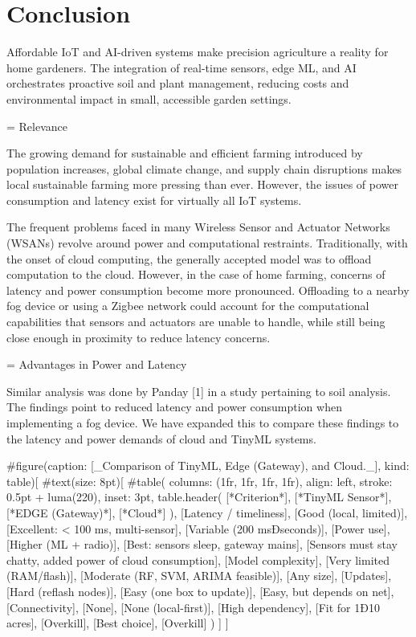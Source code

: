 \documentclass{sigchi}
\begin{document}
\section{Conclusion}

Affordable IoT and AI-driven systems make precision agriculture a reality for home gardeners. The integration of real-time sensors, edge ML, and AI orchestrates proactive soil and plant management, reducing costs and environmental impact in small, accessible garden settings.


= Relevance

The growing demand for sustainable and efficient farming introduced by population increases, global climate change, and supply chain disruptions makes local sustainable farming more pressing than ever. However, the issues of power consumption and latency exist for virtually all IoT systems.  

The frequent problems faced in many Wireless Sensor and Actuator Networks (WSANs) revolve around power and computational restraints. Traditionally, with the onset of cloud computing, the generally accepted model was to offload computation to the cloud. However, in the case of home farming, concerns of latency and power consumption become more pronounced. Offloading to a nearby fog device or using a Zigbee network could account for the computational capabilities that sensors and actuators are unable to handle, while still being close enough in proximity to reduce latency concerns.

= Advantages in Power and Latency

Similar analysis was done by Panday [1] in a study pertaining to soil analysis. The findings point to reduced latency and power consumption when implementing a fog device. We have expanded this to compare these findings to the latency and power demands of cloud and TinyML systems.

#figure(caption: [_Comparison of TinyML, Edge (Gateway), and Cloud._], kind: table)[
#text(size: 8pt)[
  #table(
    columns: (1fr, 1fr, 1fr, 1fr),
    align: left,
    stroke: 0.5pt + luma(220),
    inset: 3pt,
    table.header(
      [*Criterion*], [*TinyML Sensor*], [*EDGE (Gateway)*], [*Cloud*]
    ),
    [Latency / timeliness], [Good (local, limited)], [Excellent: < 100 ms, multi-sensor], [Variable (200 msÐseconds)],
    [Power use], [Higher (ML + radio)], [Best: sensors sleep, gateway mains], [Sensors must stay chatty, added power of cloud consumption],
    [Model complexity], [Very limited (RAM/flash)], [Moderate (RF, SVM, ARIMA feasible)], [Any size],
    [Updates], [Hard (reflash nodes)], [Easy (one box to update)], [Easy, but depends on net],
    [Connectivity], [None], [None (local-first)], [High dependency],
    [Fit for 1Ð10 acres], [Overkill], [Best choice], [Overkill]
  )
]
]
\end{document}
